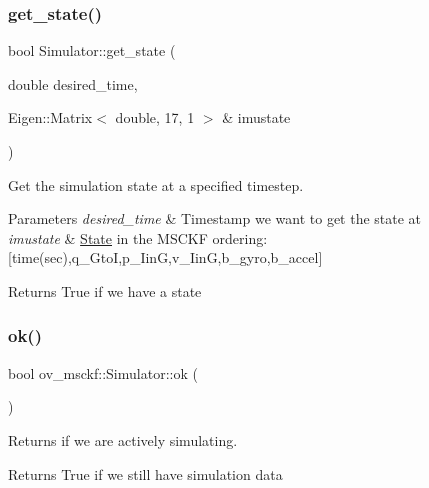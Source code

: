 \subsubsection{\texorpdfstring{get\+\_\+state()}{get\_state()}}
{\footnotesize\ttfamily bool Simulator\+::get\+\_\+state (\begin{DoxyParamCaption}\item[{double}]{desired\+\_\+time,  }\item[{Eigen\+::\+Matrix$<$ double, 17, 1 $>$ \&}]{imustate }\end{DoxyParamCaption})}



Get the simulation state at a specified timestep. 


\begin{DoxyParams}{Parameters}
{\em desired\+\_\+time} & Timestamp we want to get the state at \\
\hline
{\em imustate} & \hyperlink{classov__msckf_1_1State}{State} in the M\+S\+C\+KF ordering\+: \mbox{[}time(sec),q\+\_\+\+GtoI,p\+\_\+\+IinG,v\+\_\+\+IinG,b\+\_\+gyro,b\+\_\+accel\mbox{]} \\
\hline
\end{DoxyParams}
\begin{DoxyReturn}{Returns}
True if we have a state 
\end{DoxyReturn}
\mbox{\label{classov__msckf_1_1Simulator_a23596249c56e31c4a74567b4f4601a7c}} 
\subsubsection{\texorpdfstring{ok()}{ok()}}
{\footnotesize\ttfamily bool ov\+\_\+msckf\+::\+Simulator\+::ok (\begin{DoxyParamCaption}{ }\end{DoxyParamCaption})\hspace{0.3cm}{\ttfamily [inline]}}



Returns if we are actively simulating. 

\begin{DoxyReturn}{Returns}
True if we still have simulation data 
\end{DoxyReturn}
\mbox{\label{classov__msckf_1_1Simulator_ab7b38fccf364b602eef8294524f3f30a}} 
